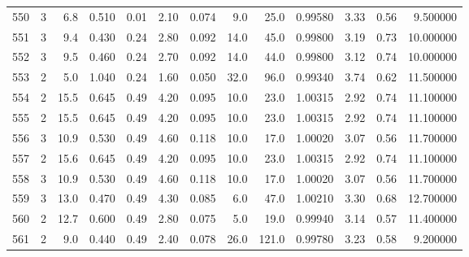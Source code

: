 \begin{tabular}{lrrrrrrrrrrrr}
550  &        3 &            6.8 &             0.510 &         0.01 &            2.10 &      0.074 &                  9.0 &                  25.0 &  0.99580 &  3.33 &       0.56 &   9.500000 \\
551  &        3 &            9.4 &             0.430 &         0.24 &            2.80 &      0.092 &                 14.0 &                  45.0 &  0.99800 &  3.19 &       0.73 &  10.000000 \\
552  &        3 &            9.5 &             0.460 &         0.24 &            2.70 &      0.092 &                 14.0 &                  44.0 &  0.99800 &  3.12 &       0.74 &  10.000000 \\
553  &        2 &            5.0 &             1.040 &         0.24 &            1.60 &      0.050 &                 32.0 &                  96.0 &  0.99340 &  3.74 &       0.62 &  11.500000 \\
554  &        2 &           15.5 &             0.645 &         0.49 &            4.20 &      0.095 &                 10.0 &                  23.0 &  1.00315 &  2.92 &       0.74 &  11.100000 \\
555  &        2 &           15.5 &             0.645 &         0.49 &            4.20 &      0.095 &                 10.0 &                  23.0 &  1.00315 &  2.92 &       0.74 &  11.100000 \\
556  &        3 &           10.9 &             0.530 &         0.49 &            4.60 &      0.118 &                 10.0 &                  17.0 &  1.00020 &  3.07 &       0.56 &  11.700000 \\
557  &        2 &           15.6 &             0.645 &         0.49 &            4.20 &      0.095 &                 10.0 &                  23.0 &  1.00315 &  2.92 &       0.74 &  11.100000 \\
558  &        3 &           10.9 &             0.530 &         0.49 &            4.60 &      0.118 &                 10.0 &                  17.0 &  1.00020 &  3.07 &       0.56 &  11.700000 \\
559  &        3 &           13.0 &             0.470 &         0.49 &            4.30 &      0.085 &                  6.0 &                  47.0 &  1.00210 &  3.30 &       0.68 &  12.700000 \\
560  &        2 &           12.7 &             0.600 &         0.49 &            2.80 &      0.075 &                  5.0 &                  19.0 &  0.99940 &  3.14 &       0.57 &  11.400000 \\
561  &        2 &            9.0 &             0.440 &         0.49 &            2.40 &      0.078 &                 26.0 &                 121.0 &  0.99780 &  3.23 &       0.58 &   9.200000 \\

\end{tabular}
